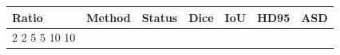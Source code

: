 \begin{tabular}{lllllll}
 \toprule
Ratio & Method & Status & Dice & IoU & HD95 & ASD \\
 \midrule
2%
2%
5%
5%
10%
10%
 \bottomrule
\end{tabular}

